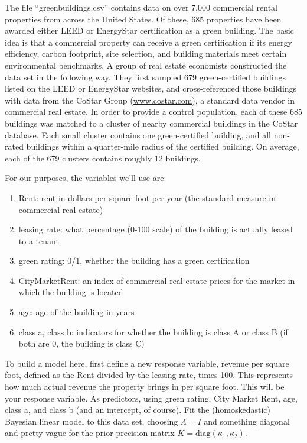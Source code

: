 \documentclass[11pt]{article}
\begin{document}
The file ``greenbuildings.csv''  contains data on over 7,000 commercial rental properties from across the United States.  Of these, 685 properties have been awarded either LEED or EnergyStar certification as a green building.  The basic idea is that a commercial property can receive a green certification if its energy efficiency, carbon footprint, site selection, and building materials meet certain environmental benchmarks.  A group of real estate economists constructed the data set in the following way.  They first sampled 679 green-certified buildings listed on the LEED or EnergyStar websites, and cross-referenced those buildings with data from the CoStar Group (\url{www.costar.com}), a standard data vendor in commercial real estate.  In order to provide a control population, each of these 685 buildings was matched to a cluster of nearby commercial buildings in the CoStar database.  Each small cluster contains one green-certified building, and all non-rated buildings within a quarter-mile radius of the certified building.  On average, each of the 679 clusters contains roughly 12 buildings.

For our purposes, the variables we'll use are:
\begin{enumerate}
\item Rent: rent in dollars per square foot per year (the standard measure in commercial real estate)  
\item leasing rate: what percentage (0-100 scale) of the building is actually leased to a tenant
\item green rating: 0/1, whether the building has a green certification  
\item CityMarketRent: an index of commercial real estate prices for the market in which the building is located  
\item age: age of the building in years
\item class a, class b: indicators for whether the building is class A or class B (if both are 0, the building is class C)  
\end{enumerate}

To build a model here, first define a new response variable, revenue per square foot, defined as the Rent divided by the leasing rate, times 100.  This represents how much actual revenue the property brings in per square foot.  This will be your response variable.  As predictors, using green rating, City Market Rent, age, class a, and class b (and an intercept, of course).  Fit the (homoskedastic) Bayesian linear model to this data set, choosing $\Lambda = I$ and something diagonal and pretty vague for the prior precision matrix $K = \mbox{diag}(\kappa_1, \kappa_2)$.
\end{document}
